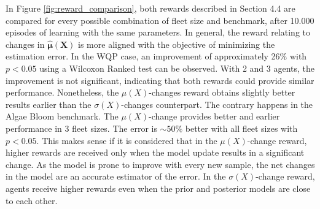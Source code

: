 \documentclass[journal]{IEEEtran}
\newcommand\vect[1]{\boldsymbol{#1}}
\begin{document}

In Figure \ref{fig:reward_comparison}, both rewards described in Section 4.4 are compared for every possible combination of fleet size and benchmark, after 10.000 episodes of learning with the same parameters. In general, the reward relating to changes in $\vect{\hat \mu(X)}$ is more aligned with the objective of minimizing the estimation error. In the WQP case, an improvement of approximately 26\% with $p < 0.05$ using a Wilcoxon Ranked test can be observed. With 2 and 3 agents, the improvement is not significant, indicating that both rewards could provide similar performance. Nonetheless, the $\mu(X)$-changes reward obtains slightly better results earlier than the $\sigma(X)$-changes counterpart. The contrary happens in the Algae Bloom benchmark. The $\mu(X)$-change provides better and earlier performance in 3 fleet sizes. The error is $\sim 50\%$ better with all fleet sizes with $p < 0.05$. This makes sense if it is considered that in the $\mu(X)$-change reward, higher rewards are received only when the model update results in a significant change. As the model is prone to improve with every new sample, the net changes in the model are an accurate estimator of the error. In the $\sigma(X)$-change reward, agents receive higher rewards even when the prior and posterior models are close to each other. 
\end{document}
